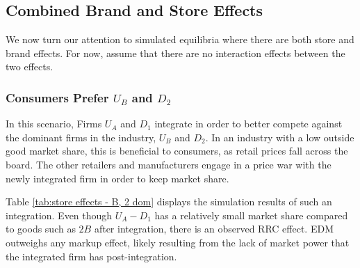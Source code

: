 \documentclass[12pt]{article}%
\begin{document}
\subsection{Combined Brand and Store Effects}

We now turn our attention to simulated equilibria where there are both store and brand effects. For now, assume that there are no interaction effects between the two effects. 

\subsubsection{Consumers Prefer $U_B$ and $D_2$}

In this scenario, Firms $U_A$ and $D_1$ integrate in order to better compete against the dominant firms in the industry, $U_B$ and $D_2$. In an industry with a low outside good market share, this is beneficial to consumers, as retail prices fall across the board. The other retailers and manufacturers engage in a price war with the newly integrated firm in order to keep market share. 

Table \ref{tab:store effects - B, 2 dom} displays the simulation results of such an integration. Even though $U_A-D_1$ has a relatively small market share compared to goods such as $2B$ after integration, there is an observed RRC effect. EDM outweighs any markup effect, likely resulting from the lack of market power that the integrated firm has post-integration. 
\end{document}
